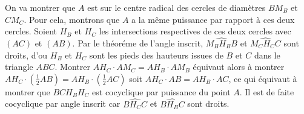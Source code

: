 \begin{sol}
\begin{center}
\end{center}

On va montrer que $A$ est sur le centre radical des cercles de diamètres $BM_B$ et $CM_C$. Pour cela, montrons que $A$ a la même puissance par rapport à ces deux cercles. Soient $H_B$ et $H_C$ les intersections respectives de ces deux cercles avec $\left(AC\right)$ et $\left(AB\right)$. Par le théoréme de l'angle inscrit, $\widehat{M_B H_B B}$ et $\widehat{M_C H_C C}$ sont droits, d'ou $H_B$ et $H_C$ sont les pieds des hauteurs issues de $B$ et $C$ dans le triangle $ABC$. Montrer $AH_C \cdot AM_C = AH_B \cdot AM_B$ équivaut alors à montrer $AH_C \cdot \left(\frac12 AB\right) = AH_B \cdot \left(\frac12 AC\right)$ soit $AH_C \cdot AB = AH_B \cdot AC$, ce qui équivaut à montrer que $B C H_B H_C$ est cocyclique par puissance du point $A$. Il est de faite cocyclique par angle inscrit car $\widehat{B H_C C}$ et $\widehat{B H_B C}$ sont droits.
\end{sol}


